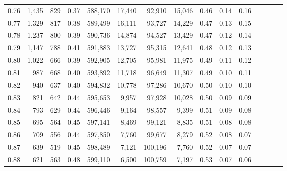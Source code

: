 \begin{tabular}{rrrcrrrrrrrrrrr}
0.76 &   1,435 &    829 &                                       0.37 &  588,170 &   17,440 &   92,910 &   15,046 &  0.46 &  0.14 &                         0.16 \\
0.77 &   1,329 &    817 &                                       0.38 &  589,499 &   16,111 &   93,727 &   14,229 &  0.47 &  0.13 &                         0.15 \\
0.78 &   1,237 &    800 &                                       0.39 &  590,736 &   14,874 &   94,527 &   13,429 &  0.47 &  0.12 &                         0.14 \\
0.79 &   1,147 &    788 &                                       0.41 &  591,883 &   13,727 &   95,315 &   12,641 &  0.48 &  0.12 &                         0.13 \\
0.80 &   1,022 &    666 &                                       0.39 &  592,905 &   12,705 &   95,981 &   11,975 &  0.49 &  0.11 &                         0.12 \\
0.81 &     987 &    668 &                                       0.40 &  593,892 &   11,718 &   96,649 &   11,307 &  0.49 &  0.10 &                         0.11 \\
0.82 &     940 &    637 &                                       0.40 &  594,832 &   10,778 &   97,286 &   10,670 &  0.50 &  0.10 &                         0.10 \\
0.83 &     821 &    642 &                                       0.44 &  595,653 &    9,957 &   97,928 &   10,028 &  0.50 &  0.09 &                         0.09 \\
0.84 &     793 &    629 &                                       0.44 &  596,446 &    9,164 &   98,557 &    9,399 &  0.51 &  0.09 &                         0.08 \\
0.85 &     695 &    564 &                                       0.45 &  597,141 &    8,469 &   99,121 &    8,835 &  0.51 &  0.08 &                         0.08 \\
0.86 &     709 &    556 &                                       0.44 &  597,850 &    7,760 &   99,677 &    8,279 &  0.52 &  0.08 &                         0.07 \\
0.87 &     639 &    519 &                                       0.45 &  598,489 &    7,121 &  100,196 &    7,760 &  0.52 &  0.07 &                         0.07 \\
0.88 &     621 &    563 &                                       0.48 &  599,110 &    6,500 &  100,759 &    7,197 &  0.53 &  0.07 &                         0.06 \\

\end{tabular}
